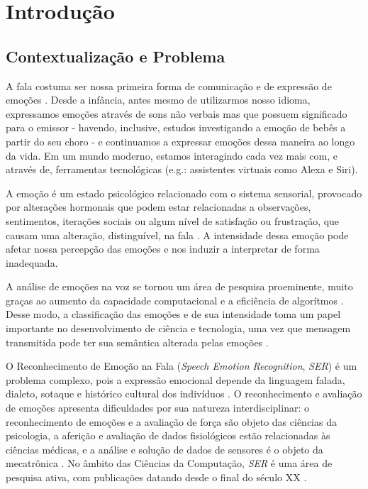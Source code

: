 \chapter{Introdução}\label{Cap:Introdução}

\section{Contextualização e Problema}

A fala costuma ser nossa primeira forma de comunicação e de expressão de emoções \cite{1.5}. Desde a infância, antes mesmo de utilizarmos nosso idioma, expressamos emoções através de sons não verbais mas que possuem significado para o emissor - havendo, inclusive, estudos investigando a emoção de bebês a partir do seu choro \cite{0} - e continuamos a expressar emoções dessa maneira ao longo da vida. Em um mundo moderno, estamos interagindo cada vez mais com, e através de, ferramentas tecnológicas (e.g.: assistentes virtuais como Alexa e Siri).

A emoção é um estado psicológico relacionado com o sistema sensorial, provocado por alterações hormonais que podem estar relacionadas a observações, sentimentos, iterações sociais ou algum nível de satisfação ou frustração, que causam uma alteração, distinguível, na fala \cite{8}. A intensidade dessa emoção pode afetar nossa percepção das emoções \cite{18.46} e nos induzir a interpretar de forma inadequada.

A análise de emoções na voz se tornou um área de pesquisa proeminente, muito graças ao aumento da capacidade computacional e a eficiência de algorítmos \cite{38} \cite{20}. Desse modo, a classificação das emoções e de sua intensidade toma um papel importante \cite{3} no desenvolvimento de ciência e tecnologia, uma vez que mensagem transmitida pode ter sua semântica alterada pelas emoções \cite{39}.

O Reconhecimento de Emoção na Fala (\textit{Speech Emotion Recognition}, \textit{SER}) é um problema complexo, pois a expressão emocional depende da linguagem falada, dialeto, sotaque e histórico cultural dos indivíduos \cite{6}. O reconhecimento e avaliação de emoções apresenta dificuldades por sua natureza interdisciplinar: o reconhecimento de emoções e a avaliação de força são objeto das ciências da psicologia, a aferição e avaliação de dados fisiológicos estão relacionadas às ciências médicas, e a análise e solução de dados de sensores é o objeto da mecatrônica \cite{17}. No âmbito das Ciências da Computação, \textit{SER} é uma área de pesquisa ativa, com publicações datando desde o final do século XX \cite{12.27}.


